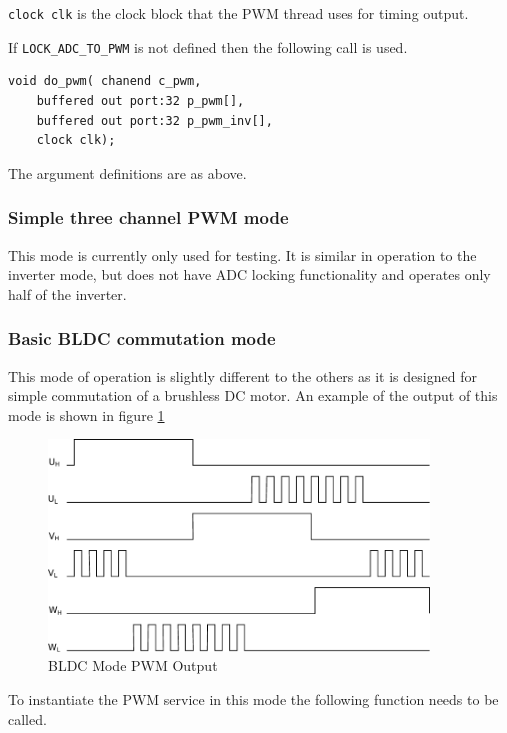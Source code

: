 \verb=clock clk= is the clock block that the PWM thread uses for timing output.

If \verb=LOCK_ADC_TO_PWM= is not defined then the following call is used.

\begin{lstlisting}
void do_pwm( chanend c_pwm,
	buffered out port:32 p_pwm[],  
	buffered out port:32 p_pwm_inv[], 
	clock clk);
\end{lstlisting}

The argument definitions are as above.

\subsubsection{Simple three channel PWM mode}

This mode is currently only used for testing. It is similar in operation to the inverter mode, but does not have ADC locking functionality and operates only half of the inverter. 

\subsubsection{Basic BLDC commutation mode}
This mode of operation is slightly different to the others as it is designed for simple commutation of a brushless DC motor. An example of the output of this mode is shown in figure \ref{fig_PwmBldcMode}

\begin{figure}[h]
\begin{center}
\includegraphics[width=0.9\textwidth]{images/bldcpwm.pdf}
\caption{BLDC Mode PWM Output}
\label{fig_PwmBldcMode}
\end{center}
\end{figure}

To instantiate the PWM service in this mode the following function needs to be called.

